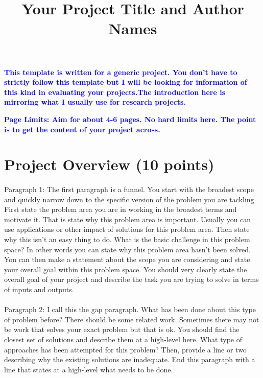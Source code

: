 \documentclass[11pt,a4paper]{article}
\begin{document}
\title{Your Project Title and Author Names}



\maketitle

\textcolor{blue}{\textbf{This template is written for a generic project. You don't have to strictly follow this template but I will be looking for information of this kind in evaluating your projects.The introduction here is mirroring what I usually use for research projects. }}

\textcolor{blue}{\textbf{Page Limits: Aim for about 4-6 pages. No hard limits here. The point is to get the content of your project across.}}
\section{Project Overview (10 points)}

\paragraph{}Paragraph 1: The first paragraph is a funnel. You start with the broadest scope and quickly narrow down to the specific version of the problem you are tackling. 
First state the problem area you are in working in the broadest terms and motivate it. That is state why this problem area is important. Usually you can use applications or other impact of solutions for this problem area.  Then state why this isn't an easy thing to do. What is the basic challenge in this problem space? In other words you can state why this problem area hasn't been solved. 
You can then make a statement about the scope you are considering and state your overall goal within this problem space. You should very clearly state  the overall goal of your project and describe the task you are trying to solve in terms of inputs and outputs.  


\paragraph{}Paragraph 2: I call this the gap paragraph. What has been done about this type of problem before? There should be some related work. Sometimes there may not be work that solves your exact problem but that is ok. You should find the closest set of solutions and describe them at a high-level here.  What type of approaches has been attempted for this problem? Then, provide a line or two describing why the existing solutions are inadequate. End this paragraph with a line that states at a high-level what needs to be done. 
\end{document}
